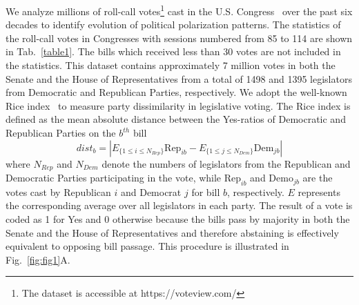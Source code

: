 We analyze millions of roll-call votes\footnote{The dataset is accessible at https://voteview.com/} cast in the U.S. Congress~\cite{lewis2018voteview} over the past six decades to identify evolution of political polarization patterns. The statistics of the roll-call votes in Congresses with sessions numbered from 85 to 114 are shown in Tab.~\ref{table1}. The bills which received less than 30 votes are not included in the statistics. This dataset contains approximately 7 million votes in both the Senate and the House of Representatives from a total of 1498 and 1395 legislators from Democratic and Republican Parties, respectively. We adopt the well-known Rice index~\cite{rice1928quantitative} to measure party dissimilarity in legislative voting. The Rice index is defined as the mean absolute distance between the Yes-ratios of Democratic and Republican Parties on the $b^{th}$ bill 
\begin{equation} \label{eq:dist_def}
\textit{dist}_b = \left| E_{\{ { 1 \leq i \leq N_{Rep}} \}}   \text{Rep}_{ib}  - E_{\{ { 1 \leq j \leq N_{Dem}} \}}  \text{Dem}_{jb} \right|
\end{equation}
where $N_{Rep}$ and $N_{Dem}$ denote the numbers of legislators from the Republican and Democratic Parties participating in the vote, while $\text{Rep}_{ib}$ and $\text{Demo}_{jb}$ are the votes cast by Republican $i$ and Democrat $j$ for bill $b$, respectively. $ {E}$ represents the corresponding average over all legislators in each party. The result of a vote is coded as 1 for Yes and 0 otherwise because the bills pass by majority in both the Senate and the House of Representatives and therefore abstaining is effectively equivalent to opposing bill passage. This procedure is illustrated in Fig.~\ref{fig:fig1}A.

